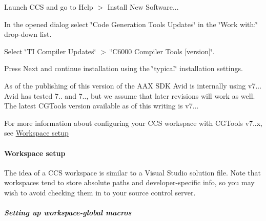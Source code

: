 \begin{DoxyEnumerate}
\begin{DoxyEnumerate}
\item Launch C\+C\+S and go to Help $>$ Install New Software...  
\item In the opened dialog select \char`\"{}\+Code Generation Tools Updates\char`\"{} in the \char`\"{}\+Work with\+:\char`\"{} drop-\/down list.  
\item Select \char`\"{}\+T\+I Compiler Updates\char`\"{} $>$ \char`\"{}\+C6000 Compiler Tools \mbox{[}version\mbox{]}\char`\"{}.  
\item Press Next and continue installation using the \char`\"{}typical\char`\"{} installation settings. 
\end{DoxyEnumerate}

As of the publishing of this version of the A\+A\+X S\+D\+K Avid is internally using v7... Avid has tested 7.. and 7.., but we assume that later revisions will work as well. The latest C\+G\+Tools version available as of this writing is v7...

For more information about configuring your C\+C\+S workspace with C\+G\+Tools v7..\+x, see \hyperlink{a00362_subsubsection__workspace_setup_}{Workspace setup} 
\end{DoxyEnumerate}

\hypertarget{a00362_subsubsection__workspace_setup_}{}\paragraph{Workspace setup}\label{a00362_subsubsection__workspace_setup_}
 The idea of a C\+C\+S workspace is similar to a Visual Studio solution file. Note that workspaces tend to store absolute paths and developer-\/specific info, so you may wish to avoid checking them in to your source control server. \subparagraph*{Setting up workspace-\/global macros }

